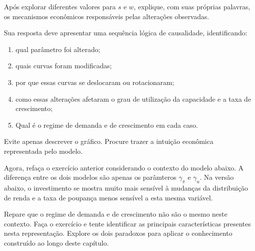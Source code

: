 \documentclass[
  brazilian,
  letterpaper,
  DIV=11,
  numbers=noendperiod]{scrreprt}
\providecommand{\tightlist}{%
  \setlength{\itemsep}{0pt}\setlength{\parskip}{0pt}}
\begin{document}
\begin{tcolorbox}[enhanced jigsaw, arc=.35mm, bottomrule=.15mm, bottomtitle=1mm, breakable, colback=white, colbacktitle=quarto-callout-note-color!10!white, colframe=quarto-callout-note-color-frame, coltitle=black, left=2mm, leftrule=.75mm, opacityback=0, opacitybacktitle=0.6, rightrule=.15mm, title=\textcolor{quarto-callout-note-color}{\faInfo}\hspace{0.5em}{Exercício}, titlerule=0mm, toprule=.15mm, toptitle=1mm]

Após explorar diferentes valores para \(s\) e \(w\), explique, com suas
próprias palavras, os mecanismos econômicos responsáveis pelas
alterações observadas.

Sua resposta deve apresentar uma sequência lógica de causalidade,
identificando:

\begin{enumerate}
\def\labelenumi{\arabic{enumi}.}
\tightlist
\item
  qual parâmetro foi alterado;
\item
  quais curvas foram modificadas;
\item
  por que essas curvas se deslocaram ou rotacionaram;
\item
  como essas alterações afetaram o grau de utilização da capacidade e a
  taxa de crescimento;
\item
  Qual é o regime de demanda e de crescimento em cada caso.
\end{enumerate}

Evite apenas descrever o gráfico. Procure trazer a intuição econômica
representada pelo modelo.

\end{tcolorbox}

Agora, refaça o exercício anterior considerando o contexto do modelo
abaixo. A diferença entre os dois modelos são apenas os parâmteros
\(\gamma_\pi\) e \(\gamma_u\). Na versão abaixo, o investimento se
mostra muito mais sensível à mudanças da distribuição de renda e a taxa
de poupança menos sensível a esta mesma variável.

Repare que o regime de demanda e de crescimento não são o mesmo neste
contexto. Faça o exercício e tente identificar as principais
características presentes nesta representação. Explore os dois paradoxos
para aplicar o conhecimento construído ao longo deste capítulo.
\end{document}
